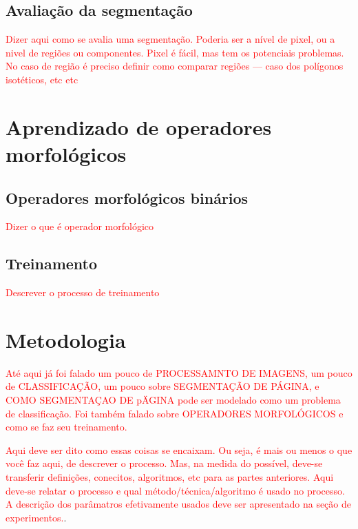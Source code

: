 \documentclass[a4paper,11pt]{article}
\newcommand{\TODO}[1]{\textcolor{red}{#1}}
\begin{document}
\subsection{Avaliação da segmentação}

\TODO{Dizer aqui como se avalia uma segmentação. Poderia ser a nível
  de pixel, ou a nivel de regiões ou componentes. Pixel é fácil, mas
  tem os potenciais problemas. No caso de região é preciso definir
  como comparar regiões --- caso dos polígonos isotéticos, etc etc}






\section{Aprendizado de operadores morfológicos}

\subsection{Operadores morfológicos binários}

\TODO{Dizer o que é operador morfológico}


\subsection{Treinamento}

\TODO{Descrever o processo de treinamento}







\section{Metodologia}

\TODO{Até aqui já foi falado um pouco de PROCESSAMNTO DE IMAGENS, um
  pouco de CLASSIFICAÇÃO, um pouco sobre SEGMENTAÇÃO DE PÁGINA, e COMO
  SEGMENTAÇAO DE pÄGINA pode ser modelado como um problema de
  classificação. Foi também falado sobre OPERADORES MORFOLÓGICOS e
  como se faz seu treinamento.}

\TODO{Aqui deve ser dito como essas coisas se encaixam. Ou seja, é
  mais ou menos o que você faz aqui, de descrever o processo. Mas, na
  medida do possível, deve-se transferir definições, conecitos,
  algoritmos, etc para as partes anteriores. Aqui deve-se relatar o
  processo e qual método/técnica/algoritmo é usado no processo. A
  descrição dos parâmatros efetivamente usados deve ser apresentado na
seção de experimentos.}.
\end{document}
